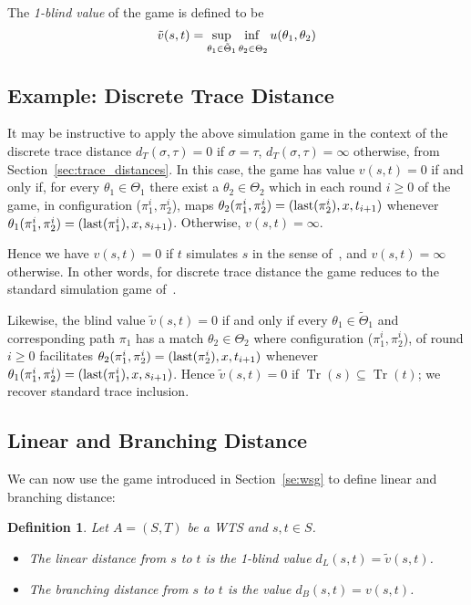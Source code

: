 \documentclass[copyright,creativecommons,sharealike]{eptcs}
\theoremstyle{plain}
\newtheorem{definition}[theorem]{Definition}
\newcommand*\Strat{\Theta}
\newcommand*\Stratblind{\tilde \Strat}
\DeclareMathOperator{\Tr}{Tr} \DeclareMathOperator{\Pa}{Pa} \DeclareMathOperator{\fPa}{fPa} \DeclareMathOperator{\tr}{tr} \DeclareMathOperator{\len}{len} \newcommand*\bigmid{\mathrel{\big|}}
\newcommand*\vblind{\tilde v}
\newcommand*\last{\textup{last}} \newcommand{\Round}[1]{\ensuremath{\textup{Round}_{(#1)}}\xspace}
\begin{document}
The \emph{1-blind value} of the game is defined to be
\begin{equation*}
  \vblind( s, t)= \adjustlimits \sup_{ \theta_1 \in \Stratblind_1}
  \inf_{ \theta_2 \in \Strat_2} u( \theta_1, \theta_2)
\end{equation*}

\subsection{Example: Discrete Trace Distance}
\label{se:discrete}

It may be instructive to apply the above simulation game in the
context of the discrete trace distance $d_T( \sigma, \tau)= 0$ if
$\sigma= \tau$, $d_T( \sigma, \tau)= \infty$ otherwise, from
Section~\ref{sec:trace_distances}.  In this case, the game has value
$v(s,t) = 0$ if and only if, for every $\theta_1\in\Strat_1$ there
exist a $\theta_2\in \Strat_2$ which in each round $i \ge 0$ of the
game, in configuration ($\pi^i_1,\pi^i_2$), maps
$\theta_2(\pi^i_1,\pi^i_2) = (\last(\pi^i_2),x,t_{i+1})$ whenever
$\theta_1(\pi^i_1,\pi^i_2) = (\last(\pi^i_1),x,s_{i+1})$.  Otherwise,
$v( s, t)= \infty$.

Hence we have $v( s, t)= 0$ if $t$ simulates $s$ in the sense
of~\cite{milner89}, and $v( s, t)= \infty$ otherwise.  In other
words, for discrete trace distance the game reduces to the standard
simulation game of~\cite{DBLP:conf/banff/Stirling95}.

Likewise, the blind value $\vblind(s,t) = 0$ if and only if every
$\theta_1 \in \Stratblind_1$ and corresponding path $\pi_1$ has a
match $\theta_2\in \Strat_2$ where configuration ($\pi^i_1,\pi^i_2$),
of round $i \geq 0$ facilitates $\theta_2(\pi^i_1,\pi^i_2) =
(\last(\pi^i_2),x,t_{i+1})$ whenever $\theta_1(\pi^i_1,\pi^i_2) =
(\last(\pi^i_1),x,s_{i+1})$.  Hence $\vblind( s, t)= 0$ if $\Tr(
s)\subseteq \Tr( t)$; we recover standard trace inclusion.

\subsection{Linear and Branching Distance}

We can now use the game introduced in Section~\ref{se:wsg} to define
linear and branching distance:

\begin{definition}
  \label{de:branch}
  Let $A=( S, T)$ be a WTS and $s, t\in S$.
  \begin{itemize}
  \item The \emph{linear distance} from $s$ to $t$ is the 1-blind
    value $d_L( s, t)= \vblind( s, t)$.
  \item The \emph{branching distance} from $s$ to $t$ is the value
    $d_B( s, t)= v( s, t)$.
  \end{itemize}
\end{definition}
\end{document}
